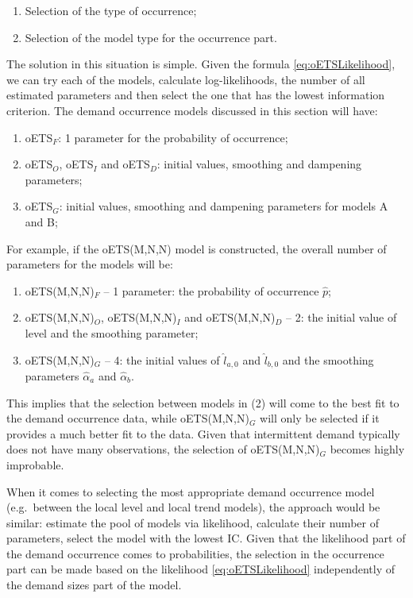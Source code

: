 \documentclass[]{book}
\providecommand{\tightlist}{%
  \setlength{\itemsep}{0pt}\setlength{\parskip}{0pt}}
\theoremstyle{definition}
\theoremstyle{definition}
\theoremstyle{definition}
\theoremstyle{definition}
\theoremstyle{remark}
\begin{document}
\begin{enumerate}
\def\labelenumi{\arabic{enumi}.}
\tightlist
\item
  Selection of the type of occurrence;
\item
  Selection of the model type for the occurrence part.
\end{enumerate}

The solution in this situation is simple. Given the formula \eqref{eq:oETSLikelihood}, we can try each of the models, calculate log-likelihoods, the number of all estimated parameters and then select the one that has the lowest information criterion. The demand occurrence models discussed in this section will have:

\begin{enumerate}
\def\labelenumi{\arabic{enumi}.}
\tightlist
\item
  oETS\(_F\): 1 parameter for the probability of occurrence;
\item
  oETS\(_O\), oETS\(_I\) and oETS\(_D\): initial values, smoothing and dampening parameters;
\item
  oETS\(_G\): initial values, smoothing and dampening parameters for models A and B;
\end{enumerate}

For example, if the oETS(M,N,N) model is constructed, the overall number of parameters for the models will be:

\begin{enumerate}
\def\labelenumi{\arabic{enumi}.}
\tightlist
\item
  oETS(M,N,N)\(_F\) -- 1 parameter: the probability of occurrence \(\hat{p}\);
\item
  oETS(M,N,N)\(_O\), oETS(M,N,N)\(_I\) and oETS(M,N,N)\(_D\) -- 2: the initial value of level and the smoothing parameter;
\item
  oETS(M,N,N)\(_G\) -- 4: the initial values of \(\hat{l}_{a,0}\) and \(\hat{l}_{b,0}\) and the smoothing parameters \(\hat{\alpha}_a\) and \(\hat{\alpha}_b\).
\end{enumerate}

This implies that the selection between models in (2) will come to the best fit to the demand occurrence data, while oETS(M,N,N)\(_G\) will only be selected if it provides a much better fit to the data. Given that intermittent demand typically does not have many observations, the selection of oETS(M,N,N)\(_G\) becomes highly improbable.

When it comes to selecting the most appropriate demand occurrence model (e.g.~between the local level and local trend models), the approach would be similar: estimate the pool of models via likelihood, calculate their number of parameters, select the model with the lowest IC. Given that the likelihood part of the demand occurrence comes to probabilities, the selection in the occurrence part can be made based on the likelihood \eqref{eq:oETSLikelihood} independently of the demand sizes part of the model.
\end{document}

